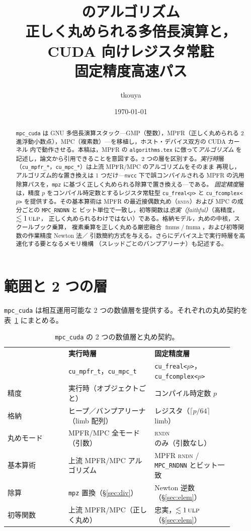 \documentclass[uplatex,dvipdfmx,a4paper,11pt]{jsarticle}
\title{\textbf{\code{mpc\_cuda} のアルゴリズム}\\[2pt]
{\large 正しく丸められる多倍長演算と，CUDA 向けレジスタ常駐\\
固定精度高速パス}}
\author{tkouya}
\date{\today}
\newcommand{\code}[1]{\texttt{#1}}
\newcommand{\PB}{\ensuremath{p}}
\newcommand{\ulp}{\textsc{ulp}}
\newcommand{\rndn}{\textsc{rndn}}
\newcommand{\fmma}{\ensuremath{\operatorname{fmma}}}
\newcommand{\fmms}{\ensuremath{\operatorname{fmms}}}
\begin{document}
\maketitle

\begin{abstract}
\noindent
\code{mpc\_cuda} は GNU 多倍長演算スタック---GMP（整数），MPFR（正しく丸められる
2 進浮動小数点），MPC（複素数）---を移植し，ホスト・デバイス双方の CUDA カーネル
内で動作させる。本稿は，MPFR の \texttt{algorithms.tex} に倣って\emph{アルゴリズム}
を記述し，論文から引用できることを意図する。2 つの層を区別する。\emph{実行時}層
（\code{cu\_mpfr\_*}，\code{cu\_mpc\_*}）は上流 MPFR/MPC のアルゴリズムをそのまま
再現し，アルゴリズム的な置き換えは 1 つだけ---\code{nvcc} 下で誤コンパイルされる
MPFR の汎用除算パスを，\code{mpz} に基づく正しく丸められる除算で置き換える---である。
\emph{固定精度}層は，精度 \PB{} をコンパイル時定数とするレジスタ常駐型
\code{cu\_freal<\PB>} と \code{cu\_fcomplex<\PB>} を提供する。その基本算術は
MPFR の最近接偶数丸め（\rndn）および MPC の成分ごとの \code{MPC\_RNDNN} と
ビット単位で一致し，初等関数は\emph{忠実（faithful）}（高精度，$\lesssim 1\,\ulp$，
正しく丸められるわけではない）である。格納モデル，丸めの中核，スクールブック乗算，
複素乗算を正しく丸める厳密融合 \fmms/\fmma，および初等関数の作業精度 Newton 法／
引数簡約方式を与える。さらにデバイス上で実行時層を高速化する要となるメモリ機構
（スレッドごとのバンプアリーナ）も記述する。
\end{abstract}

\tableofcontents

\section{範囲と 2 つの層}
\label{sec:scope}

\code{mpc\_cuda} は相互運用可能な 2 つの数値層を提供する。それぞれの丸め契約を
表~\ref{tab:layers} にまとめる。

\begin{table}[h]
\centering
\begin{tabular}{@{}p{0.24\linewidth}p{0.34\linewidth}p{0.31\linewidth}@{}}
\toprule
 & \textbf{実行時層} & \textbf{固定精度層}\\
 & \code{cu\_mpfr\_t}，\code{cu\_mpc\_t} & \code{cu\_freal<\PB>}，\code{cu\_fcomplex<\PB>}\\
\midrule
精度        & 実行時（オブジェクトごと） & コンパイル時定数 \PB\\
格納        & ヒープ／バンプアリーナ（limb 配列） & レジスタ（$\lceil \PB/64\rceil$ limb）\\
丸めモード  & MPFR/MPC 全モード（引数） & \rndn{} のみ（引数なし）\\
基本算術    & 上流 MPFR/MPC アルゴリズム & MPFR \rndn{} / \code{MPC\_RNDNN} とビット一致\\
除算        & \code{mpz} 置換（\S\ref{sec:div}） & Newton 逆数（\S\ref{sec:elem}）\\
初等関数    & 上流 MPFR/MPC（正しく丸め） & 忠実，$\lesssim 1\,\ulp$（\S\ref{sec:elem}）\\
\bottomrule
\end{tabular}
\caption{\code{mpc\_cuda} の 2 つの数値層と丸め契約。}
\label{tab:layers}
\end{table}
\end{document}
